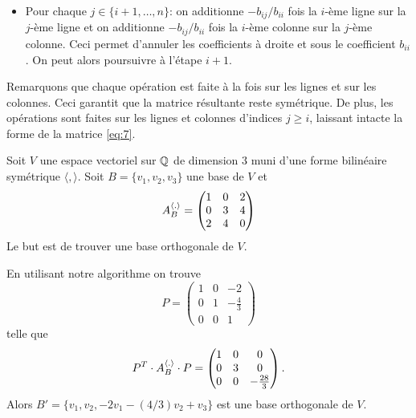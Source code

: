 \begin{algorithm}
\begin{itemize}
\item Pour chaque $j \in \{i+1,\dots,n\}$:  on additionne $-b_{ij}/b_{ii}$ fois la $i$-ème ligne sur la $j$-ème ligne et on additionne $-b_{ij}/b_{ii}$ fois la $i$-ème colonne sur la $j$-ème colonne. Ceci permet d'annuler les coefficients à droite et sous le coefficient $b_{ii}$. On peut alors poursuivre à l'étape $i+1$.
\end{itemize}    

Remarquons que chaque opération est faite à la fois sur les lignes et sur les colonnes. Ceci garantit que la matrice résultante reste symétrique. De plus, les opérations sont faites sur les lignes et colonnes d'indices $j \geq i$, laissant intacte la forme de la matrice \eqref{eq:7}.

\end{algorithm}


\begin{example}
  \label{exe:15}
  Soit $V$ une espace vectoriel sur $\mathbb{Q}$ de dimension $3$ muni d'une forme bilinéaire symétrique $〈,〉$. Soit $B = \{v_1,v_2,v_3\}$ une base de $V$ et 
  \begin{displaymath}
    A^{\langle {.} \rangle}_B =
    \begin{pmatrix}
      1 & 0 & 2\\
      0 & 3 & 4\\
      2 & 4 & 0 
    \end{pmatrix}
  \end{displaymath}
Le but est de trouver une  base orthogonale de $V$. 

En utilisant notre algorithme on trouve 
\begin{displaymath}
  P = 
  \begin{pmatrix}
    
1 & 0 & -2 \\
0 & 1 & -\frac{4}{3} \\
0 & 0 & 1
  \end{pmatrix}
\end{displaymath}
telle que 
\begin{displaymath}
  P^T \cdot A^{\langle {.} \rangle}_B \cdot P =
  \begin{pmatrix}
    1 & 0 & 0 \\
0 & 3 & 0 \\
0 & 0 & -\frac{28}{3}
  \end{pmatrix}. 
\end{displaymath}
Alors $B' = \{v_1,v_2,-2v_1 -(4/3) v_2 + v_3\}$ est une base orthogonale de $V$. 
\end{example}





